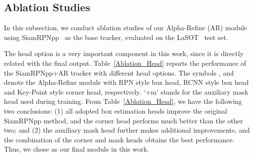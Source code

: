 \documentclass[final]{cvpr}
\begin{document}
\subsection{Ablation Studies}
In this subsection, we conduct ablation studies of our Alpha-Refine (AR) module using 
SiamRPNpp~\cite{SiamRPNplus} as the base tracker, evaluated on the LaSOT~\cite{LaSOT} test 
set. 
\begin{table}[h]
\caption{Analysis of different head options. 
The best three results are marked in \textbf{\textcolor[rgb]{1,0,0}{red}}, \textbf{\textcolor[rgb]{0,1,0}{green}} and \textbf{\textcolor[rgb]{0,0,1}{blue}} bold fonts, respectively.
Numbers are shown in percentage (\%). \label{Ablation_Head}}
\vspace{-2mm}
\begin{center}
\end{center}
\vspace{-4mm}

\end{table}


The head option is a very important component in this work, since it is directly related with the final output. 
Table~\ref{Ablation_Head} reports the performance of the SiamRPNpp+AR tracker with different head options. 
The symbols ,  and  denote the Alpha-Refine module with RPN style 
box head, RCNN style box head and Key-Point style corner head, respectively.  
`+m' stands for the auxiliary mask head used during training. 
From Table~\ref{Ablation_Head}, we have the following two conclusions: 
(1) all adopted box estimation heads improve the original SiamRPNpp method, and the corner head performs much better than the other two;
and (2) the auxiliary mask head further makes additional improvements, and the combination of the corner and mask heads 
obtains the best performance. 
Thus, we chose  as our final module in this work. 
\end{document}
